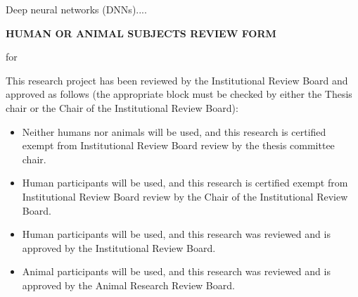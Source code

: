 \begin{center}
    \textbf{\thesistitle}
    
    \textbf{\authorname}
\end{center}


\noindent
Deep neural networks (DNNs)....


\cleardoublepage
{}

\renewcommand{\baselinestretch}{1}\normalsize

\clearpage


\begin{center}
    \textbf{HUMAN OR ANIMAL SUBJECTS REVIEW FORM}
\end{center}

\vspace{0.5cm}

\begin{center}
    for\\[0.3cm]
    \authorname
\end{center}

\vspace{0.5cm}

\begin{center}
    \textbf{\thesistitle}
\end{center}

\vspace{1.2cm}

\noindent
This research project has been reviewed by the Institutional Review Board and approved as follows (the appropriate block must be checked by either the Thesis chair or the Chair of the Institutional Review Board):

\vspace{0.4cm}

\begin{itemize}
    \item[$\square$]
    Neither humans nor animals will be used, and this research is certified exempt from Institutional Review Board review by the thesis committee chair.

    \item[$\square$]
    Human participants will be used, and this research is certified exempt from Institutional Review Board review by the Chair of the Institutional Review Board.

    \item[$\square$]
    Human participants will be used, and this research was reviewed and is approved by the Institutional Review Board.

    \item[$\square$]
    Animal participants will be used, and this research was reviewed and is approved by the Animal Research Review Board.
\end{itemize}

